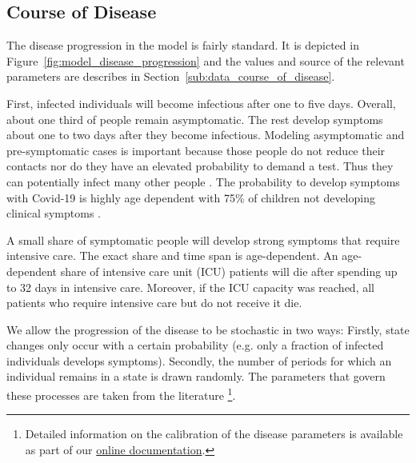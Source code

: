 \subsection{Course of Disease}
\label{sub:model_course_of_disease}

The disease progression in the model is fairly standard. It is depicted in
Figure~\ref{fig:model_disease_progression} and the values and source of the relevant
parameters are describes in Section~\ref{sub:data_course_of_disease}.

First, infected individuals will become infectious after one to five days. Overall,
about one third of people remain asymptomatic. The rest develop symptoms about one to
two days after they become infectious. Modeling asymptomatic and pre-symptomatic cases
is important because those people do not reduce their contacts nor do they have an
elevated probability to demand a test. Thus they can potentially infect many other
people \citep{Donsimoni2020}. The probability to develop
symptoms with Covid-19 is highly age dependent with 75\% of children not developing
clinical symptoms \citep{Davies2020}.

A small share of symptomatic people will develop strong symptoms that require intensive
care. The exact share and time span is age-dependent. An age-dependent share of intensive
care unit (ICU) patients will die after spending up to 32 days in intensive care.
Moreover, if the ICU capacity was reached, all patients who require intensive care but do
not receive it die.


We allow the progression of the disease to be stochastic in two ways: Firstly, state
changes only occur with a certain probability (e.g. only a fraction of infected
individuals develops symptoms). Secondly, the number of periods for which an individual
remains in a state is drawn randomly. The parameters that govern these processes are
taken from the literature \footnote{ Detailed information on the calibration of the
disease parameters is available as part of our
\href{https://sid-dev.readthedocs.io/en/latest/reference_guides/epi_params.html}{online
documentation}.}.


